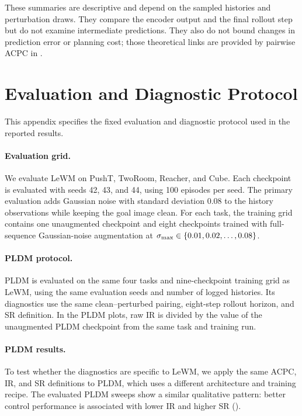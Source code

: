 These summaries are descriptive and depend on the sampled histories and
perturbation draws. They compare the encoder output and the final rollout step
but do not examine intermediate predictions. They also do not bound changes
in prediction error or planning cost; those theoretical links are provided by
pairwise ACPC in .

\section{Evaluation and Diagnostic Protocol}\label{sec:appendix-A}

This appendix specifies the fixed evaluation and diagnostic protocol used in
the reported results.

\paragraph{Evaluation grid.}
We evaluate LeWM on PushT, TwoRoom, Reacher, and Cube. Each checkpoint is
evaluated with seeds 42, 43, and 44, using 100 episodes per seed. The primary
evaluation adds Gaussian noise with standard deviation $0.08$ to the history
observations while keeping the goal image clean. For each task, the training
grid contains one unaugmented checkpoint and eight checkpoints trained with
full-sequence Gaussian-noise augmentation at
$\sigma_{\max}{}\in\{0.01,0.02,\ldots,0.08\}$.

\paragraph{PLDM protocol.}
PLDM is evaluated on the same four tasks and nine-checkpoint training grid as
LeWM, using the same evaluation seeds and number of logged histories. Its
diagnostics use the same clean--perturbed pairing, eight-step rollout horizon,
and SR definition. In the PLDM plots, raw IR is divided by the value of the
unaugmented PLDM checkpoint from the same task and training run.

\paragraph{PLDM results.}\label{sec:exp-pldm-diagnostics}
To test whether the diagnostics are specific to LeWM, we apply the same ACPC,
IR, and SR definitions to PLDM, which uses a different architecture and
training recipe. The evaluated PLDM sweeps show a similar qualitative pattern:
better control performance is associated with lower IR and higher SR
().

